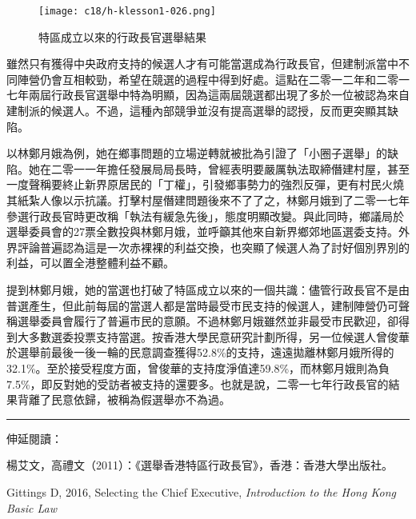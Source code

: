 \begin{figure}[htbp]
    \centering
    \texttt{[image: c18/h-klesson1-026.png]}
    \caption{特區成立以來的行政長官選舉結果} 
\end{figure}

雖然只有獲得中央政府支持的候選人才有可能當選成為行政長官，但建制派當中不同陣營仍會互相較勁，希望在競選的過程中得到好處。這點在二零一二年和二零一七年兩屆行政長官選舉中特為明顯，因為這兩屆競選都出現了多於一位被認為來自建制派的候選人。不過，這種內部競爭並沒有提高選舉的認授，反而更突顯其缺陷。

以林鄭月娥為例，她在鄉事問題的立場逆轉就被批為引證了「小圈子選舉」的缺陷。她在二零一一年擔任發展局局長時，曾經表明要嚴厲執法取締僭建村屋，甚至一度聲稱要終止新界原居民的「丁權」，引發鄉事勢力的強烈反彈，更有村民火燒其紙紮人像以示抗議。打擊村屋僭建問題後來不了了之，林鄭月娥到了二零一七年參選行政長官時更改稱「執法有緩急先後」，態度明顯改變。與此同時，鄉議局於選舉委員會的27票全數投與林鄭月娥，並呼籲其他來自新界鄉郊地區選委支持。外界評論普遍認為這是一次赤裸裸的利益交換，也突顯了候選人為了討好個別界別的利益，可以置全港整體利益不顧。

提到林鄭月娥，她的當選也打破了特區成立以來的一個共識：儘管行政長官不是由普選產生，但此前每屆的當選人都是當時最受市民支持的候選人，建制陣營仍可聲稱選舉委員會履行了普遍市民的意願。不過林鄭月娥雖然並非最受市民歡迎，卻得到大多數選委投票支持當選。按香港大學民意研究計劃所得，另一位候選人曾俊華於選舉前最後一後一輪的民意調查獲得52.8\%的支持，遠遠拋離林鄭月娥所得的32.1\%。至於接受程度方面，曾俊華的支持度淨值達59.8\%，而林鄭月娥則為負7.5\%，即反對她的受訪者被支持的還要多。也就是說，二零一七年行政長官的結果背離了民意依歸，被稱為假選舉亦不為過。

\rule[-10pt]{15cm}{0.05em}

伸延閱讀：

楊艾文，高禮文（2011）：《選舉香港特區行政長官》，香港：香港大學出版社。

Gittings D, 2016, Selecting the Chief Executive, \textit{Introduction to the Hong Kong Basic Law}